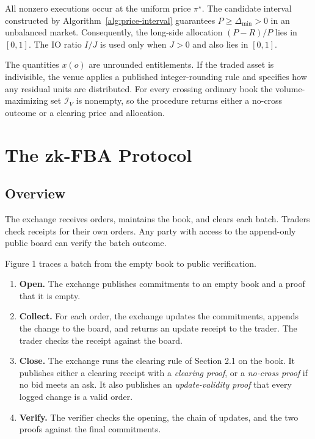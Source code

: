All nonzero executions occur at the uniform price $\pi^\star$. The candidate
interval constructed by Algorithm~\ref{alg:price-interval} guarantees
$P\geq\Delta_{\min}>0$ in an unbalanced market. Consequently, the long-side
allocation $(P-R)/P$ lies in $[0,1]$. The IO ratio $I/J$ is used only when
$J>0$ and also lies in $[0,1]$.

The quantities $x(o)$ are unrounded entitlements. If the traded asset is
indivisible, the venue applies a published integer-rounding rule and specifies
how any residual units are distributed. For every crossing ordinary book the
volume-maximizing set $\mathcal{I}_V$ is nonempty, so the procedure returns
either a no-cross outcome or a clearing price and allocation.




\section{The zk-FBA Protocol}

\subsection{Overview}

The exchange receives orders, maintains the book, and clears each batch. Traders check receipts for their own orders. Any party with access to the append-only public board can verify the batch outcome.

Figure 1 traces a batch from the empty book to public verification.

\begin{enumerate}
\def\labelenumi{\arabic{enumi}.}
\item
  \textbf{Open.} The exchange publishes commitments to an empty book and a proof that it is empty.
\item
  \textbf{Collect.} For each order, the exchange updates the commitments, appends the change to the board, and returns an update receipt to the trader. The trader checks the receipt against the board.
\item
  \textbf{Close.} The exchange runs the clearing rule of Section 2.1 on the book. It publishes either a clearing receipt with a \emph{clearing proof}, or a \emph{no-cross proof} if no bid meets an ask. It also publishes an \emph{update-validity proof} that every logged change is a valid order.
\item
  \textbf{Verify.} The verifier checks the opening, the chain of updates, and the two proofs against the final commitments.
\end{enumerate}

